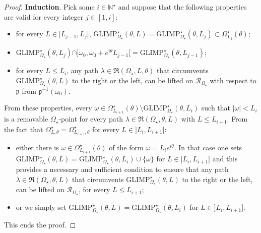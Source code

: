 \documentclass[11pt, english]{smfart}
\theoremstyle{definition}
\begin{document}
\begin{proof}
\noindent \textbf{Induction}. Pick some $i \in \mathbb{N}^\star$ and suppose that the
  following properties are valid  for every integer $j \in [1, i]$:
\begin{itemize}
\item for every $ L \in
  ]L_{j-1},L_j]$,  ${\mathrm{GLIMP}_{\Omega_\star}^\star(\theta,L) =
\mathrm{GLIMP}_{\Omega_\star}^\star(\theta,L_j) \subset
\Omega_{L_j}^\star(\theta)}$;
\item 
  $\mathrm{GLIMP}_{\Omega_\star}^\star(\theta,L_j) \cap ]\omega_0, \omega_0+
  e^{i\theta}L_{j-1}[ = \mathrm{GLIMP}_{\Omega_\star}^\star(\theta,L_{j-1})$;
\item  for every $L \leq L_i$, any path $\lambda  \in \mathfrak{R}(\Omega_\star, L,
\theta)$  that circumvents   $\mathrm{GLIMP}_{\Omega_\star}^\star(\theta,L)
$  to the right or the left, can be lifted on 
$\mathscr{R}_{\Omega_{\star}}$ with respect to $\mathfrak{p}$ from
$\mathfrak{p}^{-1}(\omega_0)$. 
\end{itemize}
From these properties,
every ${\omega \in \Omega_{L_{i+1}}^\star(\theta) \setminus
\mathrm{GLIMP}_{\Omega_\star}^\star(\theta,L_i)}$  such that $|\omega| <
L_i$ is a removable $\Omega_\star$-point for every path $\lambda \in
\mathfrak{R}(\Omega_\star, \theta, L)$ with $L \leq L_{i+1}$. 
From the fact that $\Omega_{L,\theta}^\star  =
\Omega_{L_{i+1},\theta}^\star$ for every $L \in ]L_{i}, L_{i+1}]$:
\begin{itemize}
\item either there is $\omega 
\in \Omega_{L_{i+1}}^\star(\theta)$ of the form $\omega= L_i
e^{i\theta}$. 
In that case one sets
$\mathrm{GLIMP}_{\Omega_\star}^\star(\theta,L) = \mathrm{GLIMP}_{\Omega_\star}^\star(\theta,L_i) \cup
\{\omega\}$ for $L \in ]L_i, L_{i+1}]$ and this provides a necessary
and sufficient condition to ensure that 
 any path  ${\lambda  \in \mathfrak{R}(\Omega_\star,\theta,L)}$ that
 circumvents 
$\mathrm{GLIMP}_{\Omega_\star}^\star(\theta,L)$  to the right or the left,
can be lifted on  $\mathscr{R}_{\Omega_{\star}}$,  for every $L \leq
L_{i+1}$;
\item or we simply set 
$\mathrm{GLIMP}_{\Omega_\star}^\star(\theta,L) =
\mathrm{GLIMP}_{\Omega_\star}^\star(\theta,L_i)$ for $L \in ]L_i, L_{i+1}]$.
\end{itemize}
This ends the proof.
\end{proof}
\end{document}
